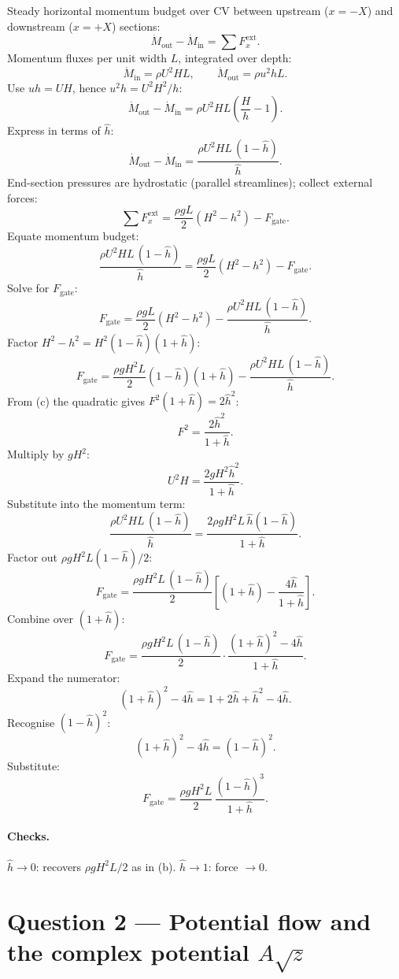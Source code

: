 \documentclass[11pt]{article}
\begin{document}
Steady horizontal momentum budget over CV between upstream ($x=-X$) and downstream ($x=+X$) sections:
\[ \dot M_{\text{out}} - \dot M_{\text{in}} = \sum F_{x}^{\text{ext}}. \]
Momentum fluxes per unit width $L$, integrated over depth:
\[ \dot M_{\text{in}} = \rho U^{2}HL,\qquad \dot M_{\text{out}} = \rho u^{2}hL. \]
Use $uh=UH$, hence $u^{2}h = U^{2}H^{2}/h$:
\[ \dot M_{\text{out}} - \dot M_{\text{in}} = \rho U^{2}HL\!\left(\frac{H}{h} - 1\right). \]
Express in terms of $\hat h$:
\[ \dot M_{\text{out}} - \dot M_{\text{in}} = \frac{\rho U^{2}HL\,(1-\hat h)}{\hat h}. \]
End-section pressures are hydrostatic (parallel streamlines); collect external forces:
\[ \sum F_{x}^{\text{ext}} = \frac{\rho g L}{2}\!\left(H^{2}-h^{2}\right) - F_{\text{gate}}. \]
Equate momentum budget:
\[ \frac{\rho U^{2}HL\,(1-\hat h)}{\hat h} = \frac{\rho g L}{2}\!\left(H^{2}-h^{2}\right) - F_{\text{gate}}. \]
Solve for $F_{\text{gate}}$:
\[ F_{\text{gate}} = \frac{\rho g L}{2}\!\left(H^{2}-h^{2}\right) - \frac{\rho U^{2}HL\,(1-\hat h)}{\hat h}. \]
Factor $H^{2}-h^{2} = H^{2}(1-\hat h)(1+\hat h)$:
\[ F_{\text{gate}} = \frac{\rho g H^{2}L}{2}(1-\hat h)(1+\hat h) - \frac{\rho U^{2}HL\,(1-\hat h)}{\hat h}. \]
From (c) the quadratic gives $F^{2}(1+\hat h) = 2\hat h^{2}$:
\[ F^{2} = \frac{2\hat h^{2}}{1+\hat h}. \]
Multiply by $gH^{2}$:
\[ U^{2}H = \frac{2gH^{2}\hat h^{2}}{1+\hat h}. \]
Substitute into the momentum term:
\[ \frac{\rho U^{2}HL\,(1-\hat h)}{\hat h} = \frac{2\rho g H^{2}L\,\hat h(1-\hat h)}{1+\hat h}. \]
Factor out $\rho g H^{2}L(1-\hat h)/2$:
\[ F_{\text{gate}} = \frac{\rho g H^{2}L\,(1-\hat h)}{2}\!\left[(1+\hat h) - \frac{4\hat h}{1+\hat h}\right]. \]
Combine over $(1+\hat h)$:
\[ F_{\text{gate}} = \frac{\rho g H^{2}L\,(1-\hat h)}{2}\cdot\frac{(1+\hat h)^{2} - 4\hat h}{1+\hat h}. \]
Expand the numerator:
\[ (1+\hat h)^{2} - 4\hat h = 1 + 2\hat h + \hat h^{2} - 4\hat h. \]
Recognise $(1-\hat h)^{2}$:
\[ (1+\hat h)^{2} - 4\hat h = (1-\hat h)^{2}. \]
Substitute:
\[ \boxed{\;F_{\text{gate}} = \frac{\rho g H^{2}L}{2}\,\frac{(1-\hat h)^{3}}{1+\hat h}.\;} \]

\paragraph{Checks.} $\hat h\to 0$: recovers $\rho g H^{2}L/2$ as in (b). $\hat h\to 1$: force $\to 0$.

\section*{Question 2 --- Potential flow and the complex potential $A\sqrt z$}
\end{document}
